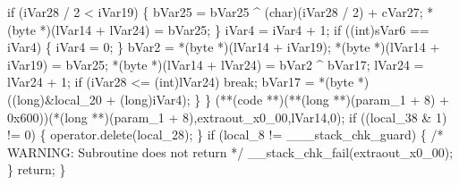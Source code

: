 \documentclass[
]{article}
\newenvironment{Shaded}{}{}
\newcommand{\NormalTok}[1]{#1}
\begin{document}
\begin{Shaded}
\begin{Highlighting}[]
\NormalTok{      if (iVar28 / 2 \textless{} iVar19) \{}
\NormalTok{        bVar25 = bVar25 \^{} (char)(iVar28 / 2) + cVar27;}
\NormalTok{        *(byte *)(lVar14 + lVar24) = bVar25;}
\NormalTok{      \}}
\NormalTok{      iVar4 = iVar4 + 1;}
\NormalTok{      if ((int)sVar6 == iVar4) \{}
\NormalTok{        iVar4 = 0;}
\NormalTok{      \}}
\NormalTok{      bVar2 = *(byte *)(lVar14 + iVar19);}
\NormalTok{      *(byte *)(lVar14 + iVar19) = bVar25;}
\NormalTok{      *(byte *)(lVar14 + lVar24) = bVar2 \^{} bVar17;}
\NormalTok{      lVar24 = lVar24 + 1;}
\NormalTok{      if (iVar28 \textless{}= (int)lVar24) break;}
\NormalTok{      bVar17 = *(byte *)((long)\&local\_20 + (long)iVar4);}
\NormalTok{    \}}
\NormalTok{  \}}
\NormalTok{  (**(code **)(**(long **)(param\_1 + 8) + 0x600))(*(long **)(param\_1 + 8),extraout\_x0\_00,lVar14,0);}
\NormalTok{  if ((local\_38 \& 1) != 0) \{}
\NormalTok{    operator.delete(local\_28);}
\NormalTok{  \}}
\NormalTok{  if (local\_8 != \_\_\_stack\_chk\_guard) \{}
\NormalTok{                    /* WARNING: Subroutine does not return */}
\NormalTok{    \_\_stack\_chk\_fail(extraout\_x0\_00);}
\NormalTok{  \}}
\NormalTok{  return;}
\NormalTok{\}}
\end{Highlighting}
\end{Shaded}
\end{document}
